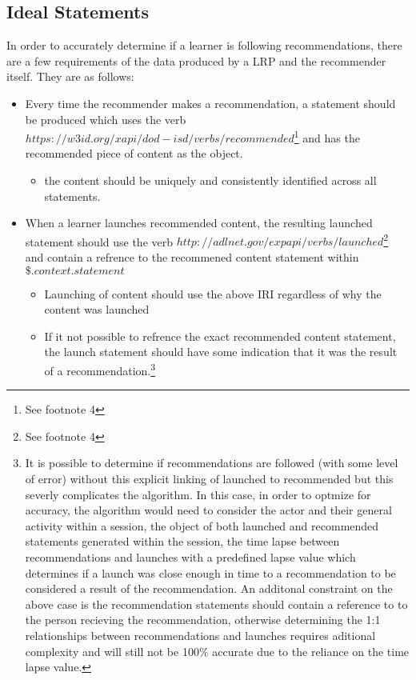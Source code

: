 \documentclass{article}
\begin{document}
\subsection{Ideal Statements}
In order to accurately determine if a learner is following
recommendations, there are a few requirements of the data produced by
a LRP and the recommender itself. They are as follows:
\begin{itemize}
\item Every time the recommender makes a recommendation, a statement
  should be produced which uses the verb
  $https://w3id.org/xapi/dod-isd/verbs/recommended$\footnote{\label{RecommendedIRI}
  See footnote 4} and has the
  recommended piece of content as the object.
  \begin{itemize}
    \item the content should be uniquely and consistently identified
      across all statements.
    \end{itemize}
\item When a learner launches recommended content, the resulting
  launched statement should use the verb
  $http://adlnet.gov/expapi/verbs/launched$\footnote{\label{LaunchedIRI}
  See footnote 4} and contain a refrence to the recommened content statement within
$\$.context.statement$
  \begin{itemize}
    \item Launching of content should use the above IRI regardless of
      why the content was launched
    \item If it not possible to refrence the exact recommended content
      statement, the launch statement should have some indication that
      it was the result of a recommendation.\footnote{\label{Recommendations} It is
    possible to determine if recommendations are followed (with some
    level of error) without this explicit linking of launched to
    recommended but this severly complicates the algorithm. In this
    case, in order to optmize for accuracy, the algorithm would need
    to consider the actor and their general activity within a session,
    the object of both launched and recommended statements generated
    within the session, the time lapse between recommendations and
    launches with a predefined lapse value which determines if a
    launch was close enough in time to a recommendation to be
    considered a result of the recommendation. An additonal constraint
    on the above case is the recommendation statements should contain
    a reference to to the person recieving the recommendation,
    otherwise determining the 1:1 relationships between recommendations and
    launches requires aditional complexity and will still not be 100\%
    accurate due to the reliance on the time lapse value.}
\end{itemize}
\end{itemize}
\end{document}
